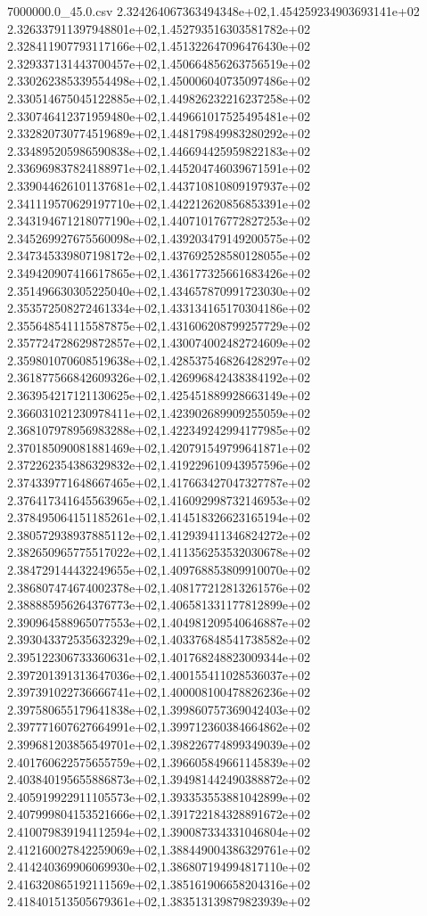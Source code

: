 \begin{filecontents*}{7000000.0_45.0.csv}
2.324264067363494348e+02,1.454259234903693141e+02
2.326337911397948801e+02,1.452793516303581782e+02
2.328411907793117166e+02,1.451322647096476430e+02
2.329337131443700457e+02,1.450664856263756519e+02
2.330262385339554498e+02,1.450006040735097486e+02
2.330514675045122885e+02,1.449826232216237258e+02
2.330746412371959480e+02,1.449661017525495481e+02
2.332820730774519689e+02,1.448179849983280292e+02
2.334895205986590838e+02,1.446694425959822183e+02
2.336969837824188971e+02,1.445204746039671591e+02
2.339044626101137681e+02,1.443710810809197937e+02
2.341119570629197710e+02,1.442212620856853391e+02
2.343194671218077190e+02,1.440710176772827253e+02
2.345269927675560098e+02,1.439203479149200575e+02
2.347345339807198172e+02,1.437692528580128055e+02
2.349420907416617865e+02,1.436177325661683426e+02
2.351496630305225040e+02,1.434657870991723030e+02
2.353572508272461334e+02,1.433134165170304186e+02
2.355648541115587875e+02,1.431606208799257729e+02
2.357724728629872857e+02,1.430074002482724609e+02
2.359801070608519638e+02,1.428537546826428297e+02
2.361877566842609326e+02,1.426996842438384192e+02
2.363954217121130625e+02,1.425451889928663149e+02
2.366031021230978411e+02,1.423902689909255059e+02
2.368107978956983288e+02,1.422349242994177985e+02
2.370185090081881469e+02,1.420791549799641871e+02
2.372262354386329832e+02,1.419229610943957596e+02
2.374339771648667465e+02,1.417663427047327787e+02
2.376417341645563965e+02,1.416092998732146953e+02
2.378495064151185261e+02,1.414518326623165194e+02
2.380572938937885112e+02,1.412939411346824272e+02
2.382650965775517022e+02,1.411356253532030678e+02
2.384729144432249655e+02,1.409768853809910070e+02
2.386807474674002378e+02,1.408177212813261576e+02
2.388885956264376773e+02,1.406581331177812899e+02
2.390964588965077553e+02,1.404981209540646887e+02
2.393043372535632329e+02,1.403376848541738582e+02
2.395122306733360631e+02,1.401768248823009344e+02
2.397201391313647036e+02,1.400155411028536037e+02
2.397391022736666741e+02,1.400008100478826236e+02
2.397580655179641838e+02,1.399860757369042403e+02
2.397771607627664991e+02,1.399712360384664862e+02
2.399681203856549701e+02,1.398226774899349039e+02
2.401760622575655759e+02,1.396605849661145839e+02
2.403840195655886873e+02,1.394981442490388872e+02
2.405919922911105573e+02,1.393353553881042899e+02
2.407999804153521666e+02,1.391722184328891672e+02
2.410079839194112594e+02,1.390087334331046804e+02
2.412160027842259069e+02,1.388449004386329761e+02
2.414240369906069930e+02,1.386807194994817110e+02
2.416320865192111569e+02,1.385161906658204316e+02
2.418401513505679361e+02,1.383513139879823939e+02

\end{filecontents*}
